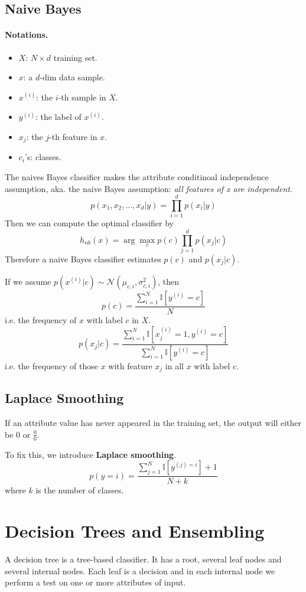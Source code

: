     \subsection{Naive Bayes}
        \paragraph{Notations.}
            \begin{itemize}
                \item $X$: $N \times d$ training set. 
                \item $x$: a $d$-dim data sample.
                \item $x^{(i)}$: the $i$-th sample in $X$.
                \item $y^{(i)}$: the label of $x^{(i)}$.
                \item $x_j$: the $j$-th feature in $x$.
                \item $c_i$'s: classes.
            \end{itemize}
        The naives Bayes classifier makes the attribute conditinoal independence assumption, aka. the naive Bayes assumption: \emph{all features of x are independent}.
        \[ p(x_1, x_2,\dots,x_d | y) = \prod_{i=1}^d p(x_i|y) \]
        Then we can compute the optimal classifier by
        \[ h_{nb}(x) = \arg\max_{c}p(c)\prod_{j=1}^d p(x_j|c) \]
        Therefore a naive Bayes classifier estimates $p(c)$ and $p(x_j|c)$.

        If we assume $p(x^{(i)}|c) \sim \mathcal{N}(\mu_{c,i}, \sigma^2_{c,i})$, then
        \[ p(c) = \frac{\sum_{i=1}^N\mathbb{I}[y^{(i)}=c]}{N} \]
        i.e. the frequency of $x$ with label $c$ in $X$.
        \[ p(x_j|c) = \frac{\sum_{i=1}^N\mathbb{I}[x^{(i)}_j = 1, y^{(i)}=c]}{\sum_{i=1}^N\mathbb{I}[y^{(i)}=c]} \]
        i.e. the frequency of those $x$ with feature $x_j$ in all $x$ with label $c$.

    \subsection{Laplace Smoothing}
        If an attribute value has never appeared in the training set, the output will either be $0$ or $\frac{0}{0}$.

        To fix this, we introduce \textbf{Laplace smoothing}.
        \[ p(y=i) = \frac{\sum_{j=1}^N\mathbb{I}[y^{(j)=i}] + 1}{N + k} \]
        where $k$ is the number of classes.


\section{Decision Trees and Ensembling}
    A decision tree is a tree-based classifier. It has a root, several leaf nodes and several internal nodes. Each leaf is a decision and in each internal node we perform a test on one or more attributes of input.

